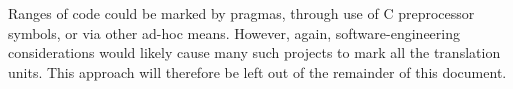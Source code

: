 Ranges of code could be marked by pragmas, through use of C preprocessor
symbols, or via other ad-hoc means.
However, again, software-engineering considerations would likely cause
many such projects to mark all the translation units.
This approach will therefore be left out of the remainder of this document.
